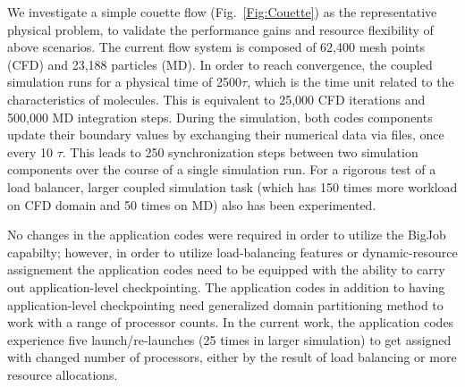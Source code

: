 \documentclass[conference,final]{IEEEtran}
\begin{document}
We investigate a simple couette flow (Fig.~\ref{Fig:Couette}) as the
representative physical problem, to validate the performance gains and
resource flexibility of above scenarios.
The current flow system is
composed of 62,400 mesh points (CFD) and 23,188 particles (MD).
In order to reach convergence, the coupled simulation runs for a
physical time of 2500$\tau$, which is the time unit related to the
characteristics of molecules. This is equivalent to 25,000 CFD
iterations and 500,000 MD integration steps. During the simulation,
both codes components update their boundary values by exchanging their
numerical data via files, once every 10 $\tau$. This leads to 250
synchronization steps between two simulation components over the
course of a single simulation run. For a rigorous test of a load
balancer, larger coupled simulation task (which has 150 times more
workload on CFD domain and 50 times on MD) also has been
experimented. 

No changes in the application codes were required in order to utilize
the BigJob capabilty; however, in order to utilize load-balancing
features or dynamic-resource assignement the application codes need to
be equipped with the ability to carry out application-level
checkpointing.  The application codes in addition to having
application-level checkpointing need generalized domain partitioning
method to work with a range of processor counts. In the current work,
the application codes experience five launch/re-launches (25 times in
larger simulation) to get assigned with changed number of processors,
either by the result of load balancing or more resource allocations.


\end{document}
